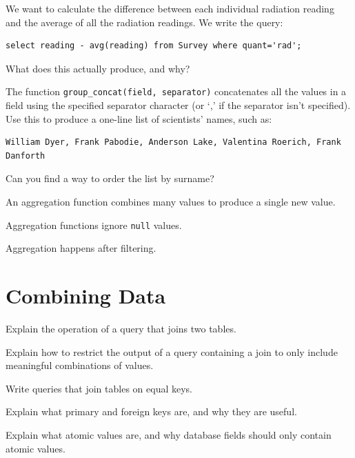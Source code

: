 \documentclass{book}
\begin{document}
\begin{challenge}
  We want to calculate the difference between each individual radiation
  reading and the average of all the radiation readings. We write the
  query:

\begin{verbatim}
select reading - avg(reading) from Survey where quant='rad';
\end{verbatim}

  What does this actually produce, and why?
\end{challenge}

\begin{challenge}
  The function \texttt{group\_concat(field, separator)} concatenates all
  the values in a field using the specified separator character (or `,'
  if the separator isn't specified). Use this to produce a one-line list
  of scientists' names, such as:

\begin{verbatim}
William Dyer, Frank Pabodie, Anderson Lake, Valentina Roerich, Frank Danforth
\end{verbatim}

  Can you find a way to order the list by surname?
\end{challenge}

\begin{keypoints}
\begin{swcitemize}
\item
  An aggregation function combines many values to produce a single new
  value.
\item
  Aggregation functions ignore \texttt{null} values.
\item
  Aggregation happens after filtering.
\end{swcitemize}
\end{keypoints}

\section{Combining Data}

\begin{objectives}
\begin{swcitemize}
\item
  Explain the operation of a query that joins two tables.
\item
  Explain how to restrict the output of a query containing a join to
  only include meaningful combinations of values.
\item
  Write queries that join tables on equal keys.
\item
  Explain what primary and foreign keys are, and why they are useful.
\item
  Explain what atomic values are, and why database fields should only
  contain atomic values.
\end{swcitemize}
\end{objectives}
\end{document}
